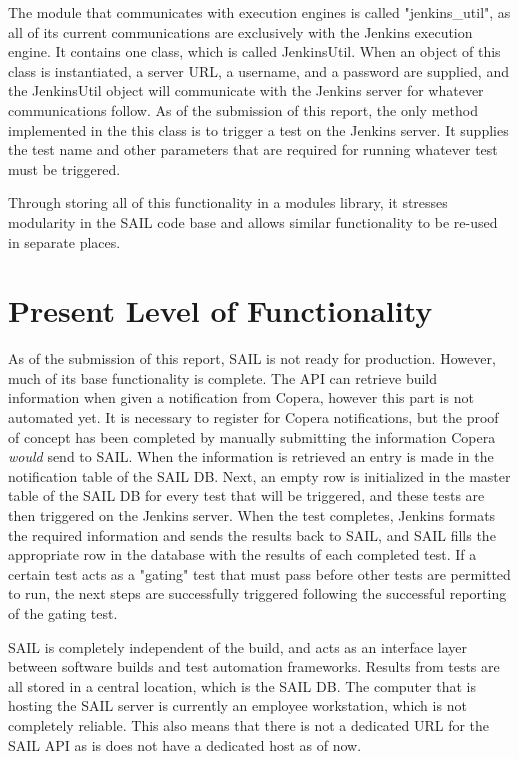 \documentclass[10pt, titlepage, onecolumn, openany]{article}
\begin{document}
The module that communicates with execution engines is called "jenkins\_util", as
all of its current communications are exclusively with the Jenkins execution engine.
It contains one class, which is called JenkinsUtil. When an object of this
class is instantiated, a server URL, a username, and a password are supplied, and
the JenkinsUtil object will communicate with the Jenkins server for
whatever communications follow. As of the submission of this report, the only
method implemented in the this class is to trigger a test on the Jenkins server.
It supplies the test name and other parameters that are required for running
whatever test must be triggered.

Through storing all of this functionality in a modules library, it stresses
modularity in the SAIL code base and allows similar functionality to be re-used
in separate places.
\clearpage
\section{Present Level of Functionality}
As of the submission of this report, SAIL is not ready for production. However,
much of its base functionality is complete. The API can retrieve build information
when given a notification from Copera, however this part is not automated yet.
It is necessary to register for Copera notifications, but the proof of concept
has been completed by manually submitting the information Copera \textit{would}
send to SAIL. When the information is retrieved an entry is made in the notification
table of the SAIL DB. Next, an empty row is initialized in the master table of the
SAIL DB for every test that will be triggered, and these tests are then triggered
on the Jenkins server. When the test completes, Jenkins formats the required information
and sends the results back to SAIL, and SAIL fills the appropriate row in the database
with the results of each completed test. If a certain test acts as a "gating" test
that must pass before other tests are permitted to run, the next steps are successfully
triggered following the successful reporting of the gating test.

SAIL is completely independent of the build, and acts as an interface layer between
software builds and test automation frameworks. Results from tests are all stored
in a central location, which is the SAIL DB. The computer that is hosting the
SAIL server is currently an employee workstation, which is not completely reliable.
This also means that there is not a dedicated URL for the SAIL API as is does not
have a dedicated host as of now.
\clearpage
\end{document}
